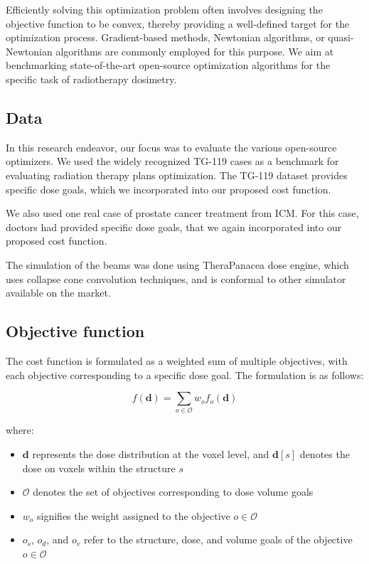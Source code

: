 \documentclass[a4paper]{article}
\begin{document}
	Efficiently solving this optimization problem often involves designing the objective function to be convex, thereby providing a well-defined target for the optimization process.
	Gradient-based methods, Newtonian algorithms, or quasi-Newtonian algorithms are commonly employed for this purpose.
	We aim at benchmarking state-of-the-art open-source optimization algorithms for the specific task of radiotherapy dosimetry.
	
	\subsection{Data}
	In this research endeavor, our focus was to evaluate the various open-source optimizers. 
	We used the widely recognized TG-119 \cite{AAPM-TG119} cases as a benchmark for evaluating radiation therapy plans optimization.
	The TG-119 dataset provides specific dose goals, which we incorporated into our proposed cost function.
	
	We also used one real case of prostate cancer treatment from ICM.
	For this case, doctors had provided specific dose goals, that we again incorporated into our proposed cost function.
	
	The simulation of the beams was done using TheraPanacea dose engine, which uses collapse cone convolution techniques, and is conformal to other simulator available on the market.
	
	\subsection{Objective function}
	The cost function is formulated as a weighted sum of multiple objectives, with each objective corresponding to a specific dose goal. The formulation is as follows:
	
	\[f(\mathbf{d}) = \sum_{o \in \mathcal{O}} w_o f_o(\mathbf{d})\]
	
	where:
	\begin{itemize}
		\item \(\mathbf{d}\) represents the dose distribution at the voxel level, and \(\mathbf{d}[s]\) denotes the dose on voxels within the structure \(s\)
		\item \(\mathcal{O}\) denotes the set of objectives corresponding to dose volume goals
		\item \(w_o\) signifies the weight assigned to the objective \(o \in \mathcal{O}\)
		\item \(o_s\), \(o_d\), and \(o_v\) refer to the structure, dose, and volume goals of the objective \(o \in \mathcal{O}\)
	\end{itemize}
	
\end{document}
